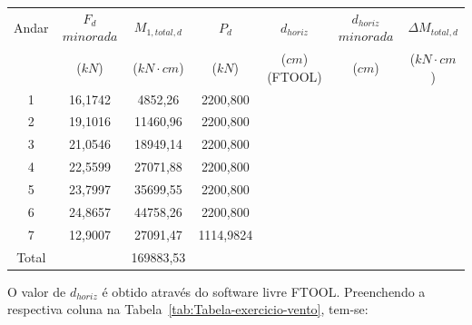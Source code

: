 \begin{table}[H]
\centering
\begin{tabular}{c|c|c|ccc|c}
\hline
Andar & $F_d$ $minorada$ & $M_{1, total, d}$ & \multicolumn{1}{c|}{$P_d$} & \multicolumn{1}{c|}{$d_{horiz}$} & $d_{horiz}$ $minorada$ & $\Delta M_{total, d}$ \\
 & ($kN$) & ($kN\cdot cm$) & \multicolumn{1}{c|}{($kN$)} & \multicolumn{1}{c|}{($cm$) (FTOOL)} & ($cm$) & ($kN\cdot cm$) \\ \hline
1 & 16,1742 & 4852,26 & \multicolumn{1}{c|}{2200,800} & \multicolumn{1}{c|}{} &  &  \\
2 & 19,1016 & 11460,96 & \multicolumn{1}{c|}{2200,800} & \multicolumn{1}{c|}{} &  &  \\
3 & 21,0546 & 18949,14 & \multicolumn{1}{c|}{2200,800} & \multicolumn{1}{c|}{} &  &  \\
4 & 22,5599 & 27071,88 & \multicolumn{1}{c|}{2200,800} & \multicolumn{1}{c|}{} &  &  \\
5 & 23,7997 & 35699,55 & \multicolumn{1}{c|}{2200,800} & \multicolumn{1}{c|}{} &  &  \\
6 & 24,8657 & 44758,26 & \multicolumn{1}{c|}{2200,800} & \multicolumn{1}{c|}{} &  &  \\
7 & 12,9007 & 27091,47 & \multicolumn{1}{c|}{1114,9824} & \multicolumn{1}{c|}{} &  &  \\ \hline
Total &  & 169883,53 &  &  &  &  \\ \cline{1-1} \cline{3-3} \cline{7-7} 
\end{tabular}
\end{table}

O valor de $d_{horiz}$ é obtido através do software livre FTOOL. Preenchendo a respectiva coluna na Tabela~\ref{tab:Tabela-exercicio-vento}, tem-se:

